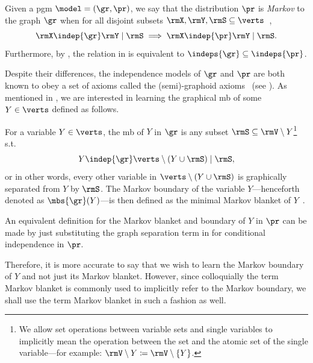 \documentclass[accepted]{uai2026} %
\theoremstyle{plain}
\theoremstyle{definition}
\theoremstyle{remark}
\begin{document}
\begin{assumption}\label{def:global-markov}
  Given a \gls{pgm} $\model=(\gr,\pr)$, we say that the distribution
  $\pr$ is \emph{Markov} to the graph $\gr$ when for all disjoint
  subsets
  $\rmX,\rmY,\rmS\subseteq\verts$~\citep{hammersley1971,lauritzen2018},
  \begin{equation}
    \label{eq:5}
    \rmX \indep{\gr} \rmY \mid \rmS \implies
    \rmX \indep{\pr} \rmY \mid \rmS.
  \end{equation}
  Furthermore, by , the relation in 
  is equivalent to $\indeps{\gr} \subseteq \indeps{\pr}$.
\end{assumption}
Despite their differences, the independence models of $\gr$ and $\pr$
are both known to obey a set of axioms called the (semi)-graphoid
axioms~\citep{pearl1989} (see ). As mentioned in
, we are interested in learning the graphical
\acrlong{mb} of some $Y\in\verts$ defined as follows.
\begin{definition} \label{def:mb} For a
  variable $Y\in\verts$, the \gls{mb} of $Y$ in $\gr$ is any subset
  $\rmS \subseteq \rmV\setminus Y$\footnote{We allow set operations
    between variable sets and single variables to implicitly mean the
    operation between the set and the atomic set of the single
    variable---for example:
    $\rmV \setminus Y \coloneq \rmV \setminus \{Y\}$.}  s.t.
  \begin{equation}
    \label{eq:def-mb}
    Y \indep{\gr} \verts \setminus (Y \cup \rmS) \mid \rmS,
  \end{equation}
  or in other words, every other variable in
  $\verts \setminus (Y \cup \rmS)$ is graphically separated from $Y$ by
  $\rmS$.  The Markov boundary of the variable $Y$---henceforth denoted
  as $\mbs{\gr}(Y)$---is then defined as the minimal Markov blanket of
  $Y$~\citep{pearl1988}.
  
  An equivalent definition for the Markov blanket and boundary of $Y$
  in $\pr$ can be made by just substituting the graph separation term
  in  for conditional independence in $\pr$.
\end{definition}
Therefore, it is more accurate to say that we wish to learn the Markov
boundary of $Y$ and not just its Markov blanket. However, since
colloquially the term Markov blanket is commonly used to implicitly
refer to the Markov boundary, we shall use the term Markov blanket in
such a fashion as well.
\end{document}
